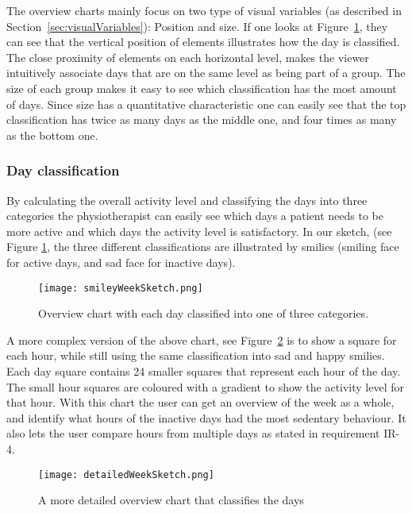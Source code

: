 The overview charts mainly focus on two type of visual variables (as described in Section~\ref{sec:visualVariables}): Position and size. If one looks at Figure~\ref{fig:smileyWeek}, they can see that the vertical position of elements illustrates how the day is classified. The close proximity of elements on each horizontal level, makes the viewer intuitively associate days that are on the same level as being part of a group. The size of each group makes it easy to see which classification has the most amount of days. Since size has a quantitative characteristic one can easily see that the top classification has twice as many days as the middle one, and four times as many as the bottom one.

\subsubsection{Day classification}
By calculating the overall activity level and classifying the days into three categories the physiotherapist can easily see which days a patient needs to be more active and which days the activity level is satisfactory. In our sketch, (see Figure \ref{fig:smileyWeek}, the three different classifications are illustrated by smilies (smiling face for active days, and sad face for inactive days).

\begin{figure}[h!]
	\centering
		\texttt{[image: smileyWeekSketch.png]}
		\caption[U1 sketch]{Overview chart with each day classified into one of three categories.}
		\label{fig:smileyWeek}
\end{figure}

A more complex version of the above chart, see Figure~\ref{fig:detailedWeek} is to show a square for each hour, while still using the same classification into sad and happy smilies. Each day square contains 24 smaller squares that represent each hour of the day. The small hour squares are coloured with a gradient to show the activity level for that hour. With this chart the user can get an overview of the week as a whole, and identify what hours of the inactive days had the most sedentary behaviour. It also lets the user compare hours from multiple days as stated in requirement IR-4.

\begin{figure}[h!]
	\centering
		\texttt{[image: detailedWeekSketch.png]}
		\caption[U2 sketch]{A more detailed overview chart that classifies the days}
		\label{fig:detailedWeek}
\end{figure}

